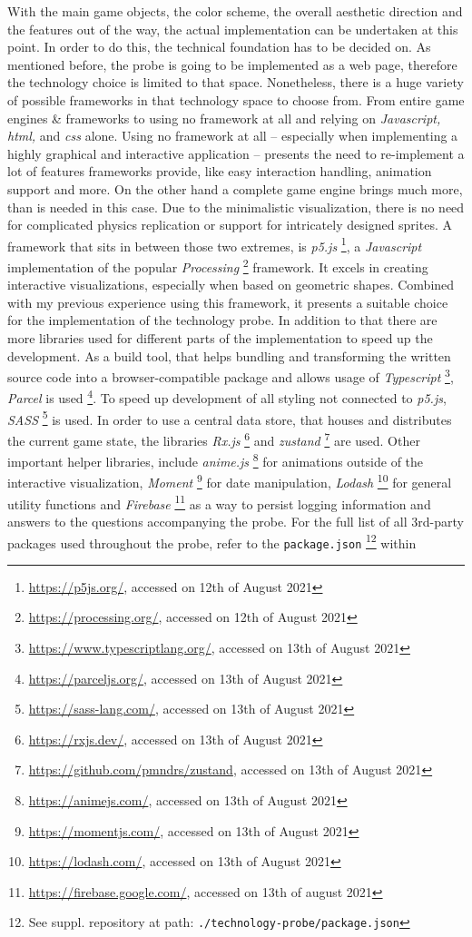 With the main game objects, the color scheme, the overall aesthetic direction and the features out of the way, the actual implementation can be undertaken at this point. In order to do this, the technical foundation has to be decided on. As mentioned before, the probe is going to be implemented as a web page, therefore the technology choice is limited to that space. Nonetheless, there is a huge variety of possible frameworks in that technology space to choose from. From entire game engines \& frameworks to using no framework at all and relying on \textit{Javascript, \gls{html},} and \textit{\gls{css}} alone. Using no framework at all -- especially when implementing a highly graphical and interactive application -- presents the need to re-implement a lot of features frameworks provide, like easy interaction handling, animation support and more. On the other hand a complete game engine brings much more, than is needed in this case. Due to the minimalistic visualization, there is no need for complicated physics replication or support for intricately designed sprites. A framework that sits in between those two extremes, is \textit{p5.js} \footnote{\url{https://p5js.org/}, accessed on 12th of August 2021}, a \textit{Javascript} implementation of the popular \textit{Processing} \footnote{\url{https://processing.org/}, accessed on 12th of August 2021} framework. It excels in creating interactive visualizations, especially when based on geometric shapes. Combined with my previous experience using this framework, it presents a suitable choice for the implementation of the technology probe. In addition to that there are more libraries used for different parts of the implementation to speed up the development. As a build tool, that helps bundling and transforming the written source code into a browser-compatible package and allows usage of \textit{Typescript} \footnote{\url{https://www.typescriptlang.org/}, accessed on 13th of August 2021}, \textit{Parcel} is used \footnote{\url{https://parceljs.org/}, accessed on 13th of August 2021}. To speed up development of all styling not connected to \textit{p5.js}, \textit{SASS} \footnote{\url{https://sass-lang.com/}, accessed on 13th of August 2021} is used. In order to use a central data store, that houses and distributes the current game state, the libraries \textit{Rx.js} \footnote{\url{https://rxjs.dev/}, accessed on 13th of August 2021} and \textit{zustand} \footnote{\url{https://github.com/pmndrs/zustand}, accessed on 13th of August 2021} are used. Other important helper libraries, include \textit{anime.js} \footnote{\url{https://animejs.com/}, accessed on 13th of August 2021} for animations outside of the interactive visualization, \textit{Moment} \footnote{\url{https://momentjs.com/}, accessed on 13th of August 2021} for date manipulation, \textit{Lodash} \footnote{\url{https://lodash.com/}, accessed on 13th of August 2021} for general utility functions and \textit{Firebase} \footnote{\url{https://firebase.google.com/}, accessed on 13th of august 2021} as a way to persist logging information and answers to the questions accompanying the probe. For the full list of all 3rd-party packages used throughout the probe, refer to the \verb|package.json| \footnote{See suppl. repository at path: \texttt{./technology-probe/package.json}} within 